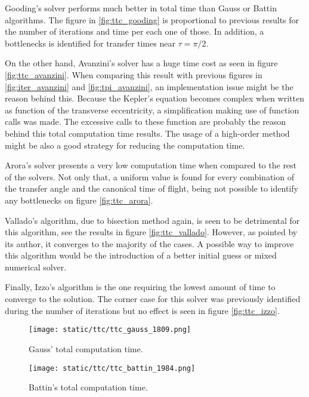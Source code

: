 Gooding's solver performs much better in total time than Gauss or Battin
algorithms. The figure in \ref{fig:ttc_gooding} is proportional to previous
results for the number of iterations and time per each one of those. In
addition, a bottlenecks is identified for transfer times near $\tau=\pi/2$.

On the other hand, Avanzini's solver has a huge time cost as seen in figure
\ref{fig:ttc_avanzini}. When comparing this result with previous figures in
\ref{fig:iter_avanzini} and \ref{fig:tpi_avanzini}, an implementation issue
might be the reason behind this. Because the Kepler's equation becomes complex
when written as function of the transverse eccentricity, a simplification making
use of function calls was made. The excessive calls to these function are
probably the reason behind this total computation time results. The usage of a
high-order method might be also a good strategy for reducing the computation time.

Arora's solver presents a very low computation time when compared to the rest of
the solvers. Not only that, a uniform value is found for every combination of
the transfer angle and the canonical time of flight, being not possible to
identify any bottlenecks on figure \ref{fig:ttc_arora}.

Vallado's algorithm, due to bisection method again, is seen to be detrimental
for this algorithm, see the results in figure \ref{fig:ttc_vallado}. However, as
pointed by its author, it converges to the majority of the cases. A possible way
to improve this algorithm would be the introduction of a better initial guess or
mixed numerical solver.

Finally, Izzo's algorithm is the one requiring the lowest amount of time to
converge to the solution. The corner case for this solver was previously
identified during the number of iterations but no effect is seen in figure
\ref{fig:ttc_izzo}.

\begin{figure}[H]
  \begin{minipage}{0.48\textwidth}
    \centering
    \texttt{[image: static/ttc/ttc\_gauss\_1809.png]}
    \caption{Gauss' total computation time.}\label{fig:ttc_gauss}
  \end{minipage}\hfill
  \begin{minipage}{0.48\textwidth}
    \centering
    \texttt{[image: static/ttc/ttc\_battin\_1984.png]}
    \caption{Battin's total computation time.}\label{fig:ttc_battin}
  \end{minipage}
\end{figure}

